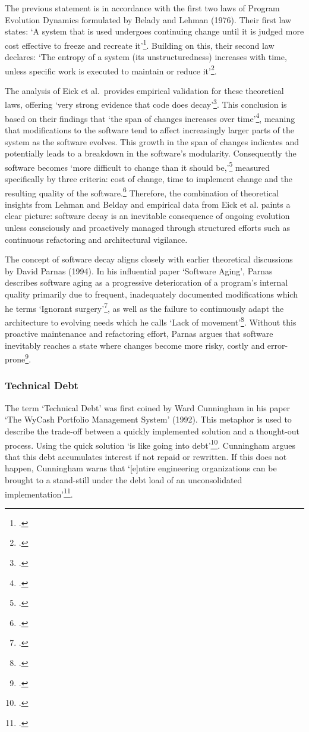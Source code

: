 The previous statement is in accordance with the first two laws of Program Evolution Dynamics formulated by Belady and Lehman (1976).
Their first law states: `A system that is used undergoes continuing change until it is judged more cost effective to freeze and recreate it'\footcite[228]{beladyModelLargeProgram1976}.
Building on this, their second law declares: `The entropy of a system (its unstructuredness) increases with time, unless specific work is executed to maintain or reduce it'\footcite[228]{beladyModelLargeProgram1976}.

The analysis of Eick et al.\ provides empirical validation for these theoretical laws, offering `very strong evidence that code does decay'\footcite[7]{eickDoesCodeDecay2001}.
This conclusion is based on their findings that `the span of changes increases over time'\footcite[7]{eickDoesCodeDecay2001}, meaning that modifications to the software tend to affect increasingly larger parts of the system as the software evolves. This growth in the span of changes indicates and potentially leads to
a breakdown in the software's modularity. Consequently the software becomes `more difficult to change than it should be,'\footcite[3]{eickDoesCodeDecay2001} measured specifically by three criteria: cost of change, time to implement change and the resulting quality of the software.\footcite[3]{eickDoesCodeDecay2001}
Therefore, the combination of theoretical insights from Lehman and Belday and empirical data from Eick et al. paints a clear picture: software decay is an inevitable consequence of ongoing evolution unless consciously and proactively managed through structured efforts such as continuous refactoring and architectural vigilance.

The concept of software decay aligns closely with earlier theoretical discussions by David Parnas (1994). In his influential paper `Software Aging', Parnas describes software aging as a progressive deterioration of a program's internal quality primarily due to frequent, 
inadequately documented modifications which he terms `Ignorant surgery'\footcite[280]{296790}, as well as the failure to continuously adapt the architecture to evolving needs which he calls `Lack of movement'\footcite[280]{296790}.
Without this proactive maintenance and refactoring effort, Parnas argues that software inevitably reaches a state where changes become more risky, costly and error-prone\footcite[280-281]{296790}.

\subsubsection{Technical Debt}
The term `Technical Debt' was first coined by Ward Cunningham in his paper `The WyCash Portfolio Management System' (1992). This metaphor is used to describe the trade-off between a quickly implemented solution and a thought-out process. 
Using the quick solution `is like going into debt'\footcite[2]{cunninghamWyCashPortfolioManagement1992}. Cunningham argues that this debt accumulates interest if not repaid or rewritten. 
If this does not happen, Cunningham warns that `[e]ntire engineering organizations can be brought to a stand-still under the debt load of an unconsolidated implementation'\footcite[2]{cunninghamWyCashPortfolioManagement1992}.

